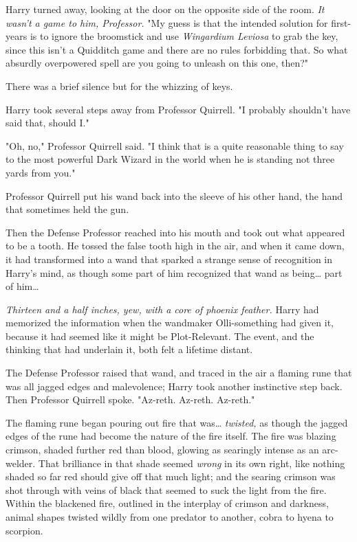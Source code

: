 Harry turned away, looking at the door on the opposite side of the room. 
\emph{It wasn't a game to him, Professor.} "My guess is that the intended 
solution for first-years is to ignore the broomstick and use \emph{Wingardium 
Leviosa} to grab the key, since this isn't a Quidditch game and there are no 
rules forbidding that. So what absurdly overpowered spell are you going to 
unleash on this one, then?"

There was a brief silence but for the whizzing of keys.

Harry took several steps away from Professor Quirrell. "I probably shouldn't 
have said that, should I."

"Oh, no," Professor Quirrell said. "I think that is a quite reasonable thing to 
say to the most powerful Dark Wizard in the world when he is standing not three 
yards from you."

Professor Quirrell put his wand back into the sleeve of his other hand, the 
hand that sometimes held the gun.

Then the Defense Professor reached into his mouth and took out what appeared to 
be a tooth. He tossed the false tooth high in the air, and when it came down, 
it had transformed into a wand that sparked a strange sense of recognition in 
Harry's mind, as though some part of him recognized that wand as being{\ldots} 
part of him{\ldots}

\emph{Thirteen and a half inches, yew, with a core of phoenix feather.} Harry 
had memorized the information when the wandmaker Olli-something had given it, 
because it had seemed like it might be Plot-Relevant. The event, and the 
thinking that had underlain it, both felt a lifetime distant.

The Defense Professor raised that wand, and traced in the air a flaming rune 
that was all jagged edges and malevolence; Harry took another instinctive step 
back. Then Professor Quirrell spoke. "Az-reth. Az-reth. Az-reth."

The flaming rune began pouring out fire that was{\ldots} \emph{twisted,} as 
though the jagged edges of the rune had become the nature of the fire itself. 
The fire was blazing crimson, shaded further red than blood, glowing as 
searingly intense as an arc-welder. That brilliance in that shade seemed 
\emph{wrong} in its own right, like nothing shaded so far red should give off 
that much light; and the searing crimson was shot through with veins of black 
that seemed to suck the light from the fire. Within the blackened fire, 
outlined in the interplay of crimson and darkness, animal shapes twisted wildly 
from one predator to another, cobra to hyena to scorpion.

